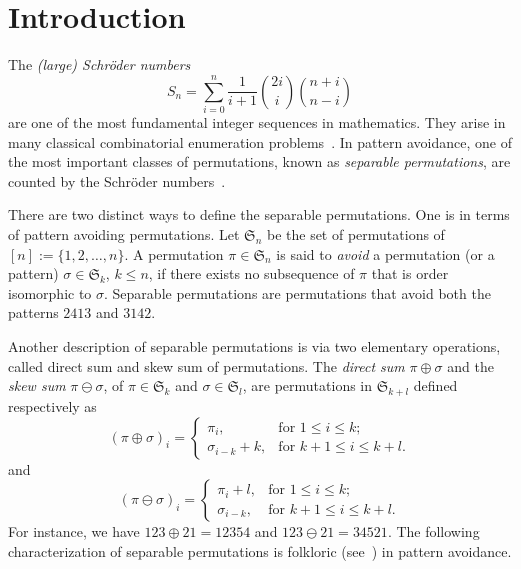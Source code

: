 \documentclass[12pt]{amsart}
\numberwithin{equation}{section}
\theoremstyle{plain}
\theoremstyle{definition}
\def\S{\mathfrak{S}}
\begin{document}

\maketitle





\section{Introduction}\label{sec1: intro}


The {\em (large) Schr\"oder numbers } 
$$
S_n=\sum_{i=0}^n\frac{1}{i+1}\binom{2i}{i}\binom{n+i}{n-i}
$$
are one of the most fundamental integer sequences in mathematics. They arise in many classical combinatorial enumeration problems~\cite{kit,shapi2,stan}. In pattern avoidance, one of  the most important classes of permutations, known as {\em separable permutations}, are counted by the Schr\"oder numbers~\cite{shapi,wes,sk}. 

There are two distinct ways to define the separable permutations. One is in terms of pattern avoiding permutations. Let $\S_n$ be the set of permutations of $[n]:=\{1,2,\ldots,n\}$. A permutation $\pi\in\S_n$ is said to {\em avoid} a permutation (or a pattern) $\sigma\in\S_k$, $k\leq n$, if there exists no subsequence of $\pi$ that is order isomorphic to $\sigma$. Separable permutations are permutations that avoid both the patterns $2413$ and $3142$. 

Another description of separable permutations is via two elementary  operations, called direct sum and skew sum of permutations. 
The \emph{direct sum} $\pi\oplus\sigma$ and the \emph{skew sum} $\pi\ominus\sigma$, of $\pi\in\S_k$ and $\sigma\in\S_l$, are permutations in $\S_{k+l}$ defined respectively as
$$
(\pi\oplus\sigma)_i=
\begin{cases}
\pi_i, &\text{for $1\leq i\leq k$};\\
\sigma_{i-k}+k, &\text{for $k+1\leq i\leq k+l$}.
\end{cases}
$$
and
$$
(\pi\ominus\sigma)_i=
\begin{cases}
\pi_i+l, &\text{for $1\leq i\leq k$};\\
\sigma_{i-k}, &\text{for $k+1\leq i\leq k+l$}.
\end{cases}
$$
 For instance, we have $123\oplus 21=12354$ and $123\ominus 21=34521$. The following  characterization of separable permutations is  folkloric  (see~\cite[p.~57--58]{kit}) in pattern avoidance. 
 
\end{document}
